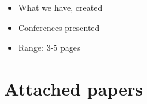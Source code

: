 \documentclass[
  digital, %
  twoside, %
  table,   %
  lof,     %
  lot,     %
]{fithesis3}
\theoremstyle{definition}
\theoremstyle{remark}
\begin{document}
\newpage
\begin{shaded}
\begin{itemize}
    \item What we have, created
    \item Conferences presented
    \item Range: 3-5 pages
\end{itemize}
\end{shaded}

\newpage


%



\printbibliography[heading=bibintoc] 




\appendix 

\chapter{Attached papers}
\end{document}
